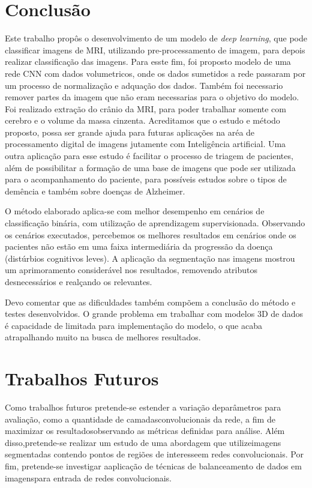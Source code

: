 \documentclass[openright]{UFRGS} %
\begin{document}
\chapter{Conclusão}

Este trabalho propôs o desenvolvimento de um modelo de \textit{deep learning}, que pode classificar imagens de MRI,
utilizando pre-processamento de imagem, para depois realizar classificação das imagens. Para esste fim, foi proposto modelo de uma rede CNN com dados
volumetricos, onde os dados sumetidos a rede passaram por um processo de
normalização e adquação dos dados. Também foi necessario  remover partes da imagem que não eram  necessarias para o objetivo do modelo. Foi realizado  extração do crânio da MRI, para poder trabalhar somente com cerebro e o volume da massa cinzenta. Acreditamos que o estudo e método proposto, possa ser grande ajuda para futuras aplicações na aréa de processamento digital de imagens jutamente com  Inteligência artificial. Uma outra aplicação para esse  estudo é facilitar o
processo de triagem de pacientes, além de
possibilitar a formação de uma base de imagens 
que pode ser utilizada para o acompanhamento do paciente,
para possíveis estudos sobre o tipos de demência  e também sobre doenças de Alzheimer.




O método elaborado aplica-se com melhor desempenho em cenários de classificação
binária, com utilização de aprendizagem supervisionada. Observando os cenários executados, percebemos os melhores resultados em cenários onde os pacientes não estão em
uma faixa intermediária da progressão da doença (distúrbios cognitivos leves). A aplicação da segmentação nas imagens mostrou um aprimoramento considerável nos resultados, removendo atributos desnecessários e realçando os relevantes.


Devo comentar que as dificuldades também compõem a conclusão do método e testes desenvolvidos. O grande problema em trabalhar com
modelos 3D de dados é capacidade de   limitada para implementação do modelo, o que acaba atrapalhando muito na busca de melhores resultados. 



\chapter{Trabalhos Futuros}


Como trabalhos futuros pretende-se estender a variação deparâmetros para avaliação, como a quantidade de camadasconvolucionais da rede, a ﬁm de maximizar os resultadosobservando as métricas deﬁnidas para análise. Além disso,pretende-se realizar um estudo de uma abordagem que utilizeimagens segmentadas contendo pontos de regiões de interesseem redes convolucionais. Por ﬁm, pretende-se investigar aaplicação de técnicas de balanceamento de dados em imagenspara entrada de redes convolucionais.
\end{document}
